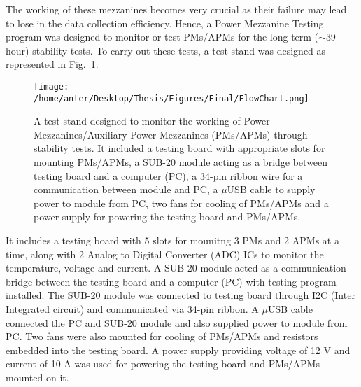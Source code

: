 The working of these mezzanines becomes very crucial as their failure may lead to lose in the data collection efficiency. Hence, a Power Mezzanine Testing program was designed to monitor or test \mhtr PMs/APMs for the long term ($\sim$39 hour) stability tests. To carry out these tests, a test-stand was designed as represented in Fig.~\ref{fig:flowchart}. 
\begin{figure}[!h]
\begin{center}
\vspace*{6mm} 
\hspace*{-3mm}
\texttt{[image: /home/anter/Desktop/Thesis/Figures/Final/FlowChart.png]}\\
\vspace*{4mm}
\caption[A test-stand designed to monitor the working of Power Mezzanines/Auxiliary Power Mezzanines (PMs/APMs) through stability tests.]{A test-stand designed to monitor the working of Power Mezzanines/Auxiliary Power Mezzanines (PMs/APMs) through stability tests. It included a testing board with appropriate slots for mounting PMs/APMs, a SUB-20 module acting as a bridge between testing board and a computer (PC), a 34-pin ribbon wire for a communication between module and PC, a $\mu$USB cable to supply power to module from PC, two fans for cooling of PMs/APMs and a power supply for powering the testing board and PMs/APMs.}
\label{fig:flowchart}
\end{center}
\end{figure} It includes a testing board with 5 slots for mounitng 3 PMs and 2 APMs at a time, along with 2 Analog to Digital Converter (ADC) ICs to monitor the temperature, voltage and current. A SUB-20 module acted as a communication bridge between the testing board and a computer (PC) with testing program installed. The SUB-20 module was connected to testing board through I2C (Inter Integrated circuit) and communicated via 34-pin ribbon. A $\mu$USB cable connected the PC and SUB-20 module and also supplied power to module from PC. Two fans were also mounted for cooling of PMs/APMs and resistors embedded into the testing board. A power supply providing voltage of 12 V and current of 10 A was used for powering the testing board and PMs/APMs mounted on it.  

